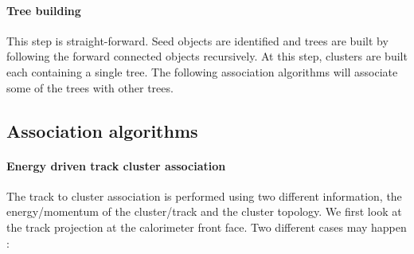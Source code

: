 \documentclass[cits]{JINST}
\begin{document}
\paragraph*{Tree building} This step is straight-forward. Seed objects are identified and trees are built by following the forward connected objects recursively. At this step, clusters are built each containing a single tree. The following association algorithms will associate some of the trees with other trees.

\subsection{Association algorithms} 


\paragraph*{Energy driven track cluster association} The track to cluster association is performed using two different information, the energy/momentum of the cluster/track and the cluster topology. We first look at the track projection at the calorimeter front face. Two different cases may happen :
\end{document}
